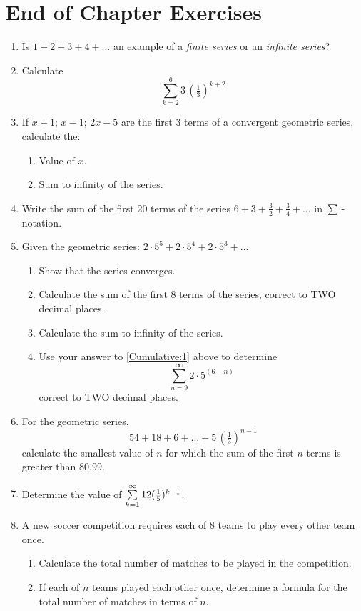 \section{End of Chapter Exercises}
\begin{enumerate}

\item Is $1 + 2 + 3 + 4 + ...$ an example of a \textit{finite series} or an \textit{infinite series}?

\item Calculate $$\sum_{k=2}^6 3 \, {(\tfrac{1}{3})}^{k+2}$$

\item If $x+1$; $x-1$; $2x-5$ are the first 3 terms of a convergent geometric series, calculate the:
\begin{enumerate}
\item Value of $x$.
\item Sum to infinity of the series.
\end{enumerate}

\item Write the sum of the first 20 terms of the series $6 + 3 + \tfrac{3}{2} + \tfrac{3}{4} + ...$ in $\sum$\,-notation.

\item Given the geometric series: $2 \cdot 5^5 + 2 \cdot 5^4 + 2 \cdot 5^3 + \ldots$
\begin{enumerate}
\item Show that the series converges.
\item Calculate the sum of the first 8 terms of the series, correct to TWO decimal places.
\item \label{Cumulative:1} Calculate the sum to infinity of the series.
\item Use your answer to \ref{Cumulative:1} above to determine $$\sum_{n=9}^\infty 2 \cdot 5^{(6-n)}$$ correct to TWO decimal places.
\end{enumerate}

\item For the geometric series, $$54 + 18 + 6 + ... + 5 \, (\tfrac{1}{3})^{n-1}$$ calculate the smallest value of $n$ for which the sum of the first $n$ terms is greater than $80.99$.

\item Determine the value of $\sum_{k=1}^\infty \limits 12(\tfrac{1}{5})^{k-1} $.

\item A new soccer competition requires each of $8$ teams to play every other team once.
\begin{enumerate}
\item Calculate the total number of matches to be played in the competition.
\item If each of $n$ teams played each other once, determine a formula for the total number of matches in terms of $n$.
\end{enumerate}


\end{enumerate}

